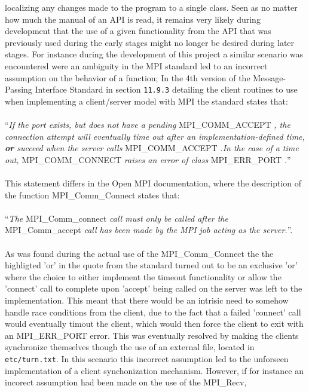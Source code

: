 \documentclass[11pt]{article}
\begin{document}
localizing any changes made to the program to a single class. Seen as no matter
how much the manual of an API is read, it remains very likely during development
that the use of a given functionality from the API that was previously used
during the early stages might no longer be desired during later stages. For
instance during the development of this project a similar scenario was
encountered were an ambiguity in the MPI standard led to an incorrect assumption
on the behavior of a function; In the 4th version of the Message-Passing
Interface Standard in section \texttt{11.9.3} detailing the client routines to
use when implementing a client/server model with MPI the standard states
that:\\\\ ``\textit{If the port exists, but does not have a pending}
MPI\_COMM\_ACCEPT \textit{, the connection attempt will eventually time out
  after an implementation-defined time, \textbf{or} succeed when the server
  calls} MPI\_COMM\_ACCEPT \textit{.In the case of a time out,}
MPI\_COMM\_CONNECT \textit{raises an error of class } MPI\_ERR\_PORT
\textit{.}''\\\\ This statement differs in the Open MPI documentation, where the
description of the function MPI\_Comm\_Connect states that:\\\\ ``\textit{The}
MPI\_Comm\_connect \textit{call must only be called after the} MPI\_Comm\_accept
\textit{call has been made by the MPI job acting as the server.}''.\\\\ As was
found during the actual use of the MPI\_Comm\_Connect the the highligted 'or' in
the quote from the standard turned out to be an exclusive 'or' where the choice
to either implement the timeout functionality or allow the 'connect' call to
complete upon 'accept' being called on the server was left to the
implementation. This meant that there would be an intrisic need to somehow
handle race conditions from the client, due to the fact that a failed 'connect'
call would eventually timout the client, which would then force the client to
exit with an MPI\_ERR\_PORT error. This was eventually resolved by making the
clients synchronize themselves though the use of an external file, located in
\texttt{etc/turn.txt}. In this scenario this incorrect assumption led to the
unforseen implementation of a client synchonization mechanism. However, if for
instance an incorect assumption had been made on the use of the MPI\_Recv,
\end{document}
